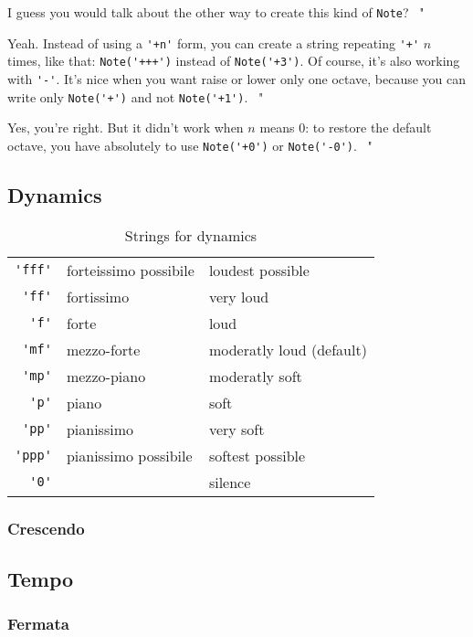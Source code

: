\documentclass{article}
\newenvironment{meenv}{ \par \noindent \makebox[6em][r]{ \textcolor{mecolor}{Me}: " --~}}{~"}
\newenvironment{myselfenv}{ \par \noindent \makebox[6em][r]{ \textcolor{myselfcolor}{Myself}: " --~}}{~"}
\newcommand{ \me }[1]{%
\begin{meenv}%
	#1%
\end{meenv} }
\newcommand{ \myself }[1]{%
\begin{myselfenv}%
	#1%
\end{myselfenv} }
\begin{document}
\myself{ I guess you would talk about the other way to create this kind of \lstinline!Note!? }
\me{ Yeah. Instead of using a \lstinline!'+n'! form, you can create a string repeating \lstinline!'+'! $n$ times, like that: \lstinline!Note('+++')! instead of \lstinline!Note('+3')!. Of course, it's also working with \lstinline!'-'!. It's nice when you want raise or lower only one octave, because you can write only \lstinline!Note('+')! and not \lstinline!Note('+1')!. }
\myself{ Yes, you're right. But it didn't work when $n$ means $0$: to restore the default octave, you have absolutely to use \lstinline!Note('+0')! or \lstinline!Note('-0')!. }

\subsection{Dynamics}

\begin{table}
	\centering
	\begin{tabular}{rll}
		\lstinline!'fff'! & forteissimo possibile & loudest possible \\
		\lstinline!'ff'! & fortissimo & very loud \\
		\lstinline!'f'! & forte & loud \\
		\lstinline!'mf'! & mezzo-forte & moderatly loud (default) \\
		\lstinline!'mp'! & mezzo-piano & moderatly soft \\
		\lstinline!'p'! & piano & soft \\
		\lstinline!'pp'! & pianissimo & very soft \\
		\lstinline!'ppp'! & pianissimo possibile & softest possible \\
		\lstinline!'0'! & & silence \\
	\end{tabular}
	\caption{Strings for dynamics}
	\label{tab:dynamics}
\end{table}

\subsubsection{Crescendo}

\subsection{Tempo}
\subsubsection{Fermata}
\end{document}
